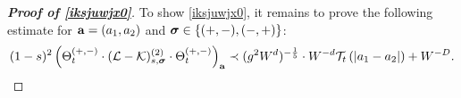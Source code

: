 \begin{proof}[\bf Proof of \eqref{iksjuwjx0}]
To show \eqref{iksjuwjx0}, it remains to prove the following estimate for ${\mathbf{a}}=(a_1,a_2)$ and ${\boldsymbol{\sigma}}\in \{(+,-),(-,+)\}$:   
\begin{align}\label{iksjuwjx}
(1-s)^2 \left(\Theta_t^{(+,-)} \cdot(\mathcal{L}-\mathcal{K})^{(2)}_{s, {\boldsymbol{\sigma}}} \cdot \Theta_t^{(+,-)}\right)_{{\mathbf{a}}}\prec (g^2W^{d})^{-\frac15}  \cdot W^{-d} {\mathcal T}_{t}\left({|a_1-a_2|}\right)+W^{-D}.
  \end{align}



\end{proof}
